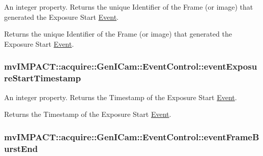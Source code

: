 An integer property. Returns the unique Identifier of the Frame (or image) that generated the Exposure Start \hyperlink{classmv_i_m_p_a_c_t_1_1acquire_1_1_event}{Event}. 

Returns the unique Identifier of the Frame (or image) that generated the Exposure Start \hyperlink{classmv_i_m_p_a_c_t_1_1acquire_1_1_event}{Event}. \hypertarget{classmv_i_m_p_a_c_t_1_1acquire_1_1_gen_i_cam_1_1_event_control_a8a8732e5f9e21444163ca09e9e77b6aa}{
\subsubsection[{event\+Exposure\+Start\+Timestamp}]{ mv\+I\+M\+P\+A\+C\+T\+::acquire\+::\+Gen\+I\+Cam\+::\+Event\+Control\+::event\+Exposure\+Start\+Timestamp}}\label{classmv_i_m_p_a_c_t_1_1acquire_1_1_gen_i_cam_1_1_event_control_a8a8732e5f9e21444163ca09e9e77b6aa}


An integer property. Returns the Timestamp of the Exposure Start \hyperlink{classmv_i_m_p_a_c_t_1_1acquire_1_1_event}{Event}. 

Returns the Timestamp of the Exposure Start \hyperlink{classmv_i_m_p_a_c_t_1_1acquire_1_1_event}{Event}. \hypertarget{classmv_i_m_p_a_c_t_1_1acquire_1_1_gen_i_cam_1_1_event_control_a1d76b2f0b911311921244cc981b3e9bd}{
\subsubsection[{event\+Frame\+Burst\+End}]{ mv\+I\+M\+P\+A\+C\+T\+::acquire\+::\+Gen\+I\+Cam\+::\+Event\+Control\+::event\+Frame\+Burst\+End}}\label{classmv_i_m_p_a_c_t_1_1acquire_1_1_gen_i_cam_1_1_event_control_a1d76b2f0b911311921244cc981b3e9bd}


